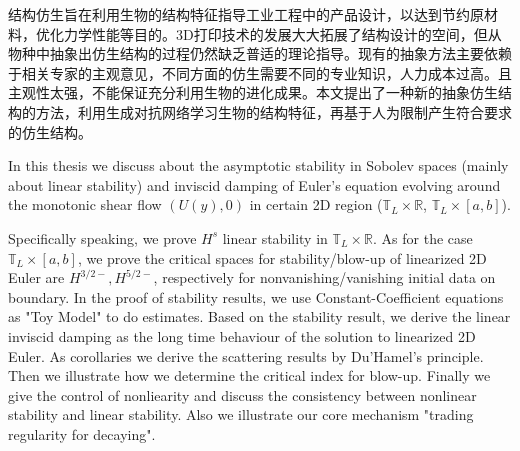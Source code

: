 \begin{cnabstract}
结构仿生旨在利用生物的结构特征指导工业工程中的产品设计，以达到节约原材料，优化力学性能等目的。3D打印技术的发展大大拓展了结构设计的空间，但从物种中抽象出仿生结构的过程仍然缺乏普适的理论指导。现有的抽象方法主要依赖于相关专家的主观意见，不同方面的仿生需要不同的专业知识，人力成本过高。且主观性太强，不能保证充分利用生物的进化成果。本文提出了一种新的抽象仿生结构的方法，利用生成对抗网络学习生物的结构特征，再基于人为限制产生符合要求的仿生结构。

\end{cnabstract}
\begin{enabstract}
In this thesis we discuss about the asymptotic stability in Sobolev spaces (mainly about linear stability) and inviscid damping of Euler's equation evolving around the monotonic shear flow $(U(y),0)$ in certain 2D region ($\mathbb{T}_L\times\mathbb{R}$, $\mathbb{T}_L\times [a,b]$). 

Specifically speaking, we prove $H^s$ linear stability in $\mathbb{T}_L\times \mathbb{R}$. As for the case $\mathbb{T}_L\times [a,b]$, we prove the critical spaces for stability/blow-up of linearized 2D Euler are $H^{3/2-}, H^{5/2-}$, respectively for nonvanishing/vanishing initial data on boundary. In the proof of stability results, we use Constant-Coefficient equations as "Toy Model" to do estimates. Based on the stability result, we derive the linear inviscid damping as the long time behaviour of the solution to linearized 2D Euler. As corollaries we derive the scattering results by Du'Hamel's principle. Then we illustrate how we determine the critical index for blow-up. Finally we give the control of nonliearity and discuss the consistency between nonlinear stability and linear stability. Also we illustrate our core mechanism "trading regularity for decaying".

\end{enabstract}
